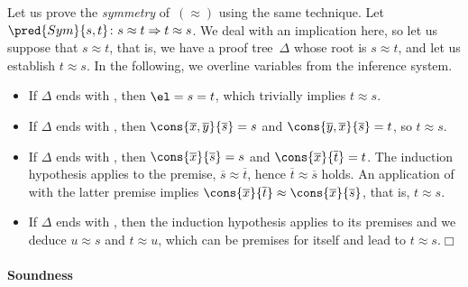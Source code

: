 Let us prove the \emph{symmetry} of~\((\approx)\) using the same
technique. Let \(\pred{Sym}{s,t}\colon s
\approx t \Rightarrow t \approx s\). We deal with an implication here,
so let us suppose that \(s \approx t\), that is, we have a proof
tree~\(\Delta\) whose root is \(s \approx t\), and let us establish
\(t \approx s\). In the following, we overline variables from the
inference system.
\begin{itemize}

  \item If \(\Delta\) ends with , then \(\el = s = t\),
    which trivially implies \(t \approx s\).

  \item If \(\Delta\) ends with , then
    \(\cons{\overline{x},\overline{y}}{\overline{s}} = s\) and
    \(\cons{\overline{y},\overline{x}}{\overline{s}} = t\), so \(t
    \approx s\).

  \item If \(\Delta\) ends with , then
    \(\cons{\overline{x}}{\overline{s}} = s\) and
    \(\cons{\overline{x}}{\overline{t}} = t\). The induction
    hypothesis applies to the premise, \(\overline{s} \approx
    \overline{t}\), hence \(\overline{t} \approx \overline{s}\)
    holds. An application of  with the latter premise
    implies \(\cons{\overline{x}}{\overline{t}} \approx
    \cons{\overline{x}}{\overline{s}}\), that is, \(t \approx s\).

  \item If \(\Delta\) ends with , then the induction
    hypothesis applies to its prem\-ises and we deduce \(u \approx s\)
    and \(t \approx u\), which can be premises for 
    itself and lead to \(t \approx s\).\hfill\(\Box\)

\end{itemize}

\paragraph{Soundness}

